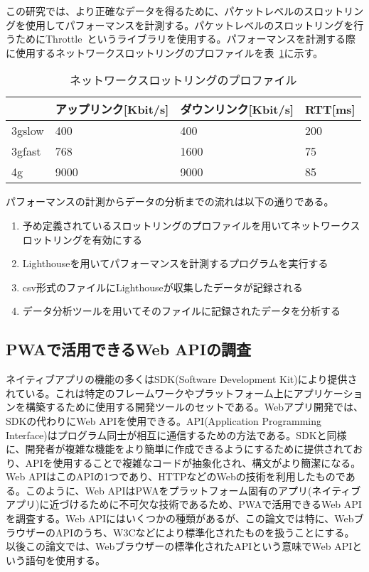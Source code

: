 この研究では、より正確なデータを得るために、パケットレベルのスロットリングを使用してパフォーマンスを計測する。パケットレベルのスロットリングを行うためにThrottle~\cite{Throttle}というライブラリを使用する。パフォーマンスを計測する際に使用するネットワークスロットリングのプロファイルを表~\ref{table:ネットワークスロットリングのプロファイル}に示す。
\begin{table}
  \caption{ネットワークスロットリングのプロファイル}
  \label{table:ネットワークスロットリングのプロファイル}
  \centering
  \begin{tabular}{|p{5em}|p{10em}|p{10em}|p{10em}|}
    \hline
    & アップリンク[Kbit/s] & ダウンリンク[Kbit/s] & RTT[ms] \\ \hline
    3gslow & 400 & 400 & 200 \\ \hline
    3gfast & 768 & 1600 & 75 \\ \hline
    4g & 9000 & 9000 & 85 \\ \hline
  \end{tabular}
\end{table}
パフォーマンスの計測からデータの分析までの流れは以下の通りである。
\begin{enumerate}
    \item 予め定義されているスロットリングのプロファイルを用いてネットワークスロットリングを有効にする
    \item Lighthouseを用いてパフォーマンスを計測するプログラムを実行する
    \item csv形式のファイルにLighthouseが収集したデータが記録される
    \item データ分析ツールを用いてそのファイルに記録されたデータを分析する
\end{enumerate}

\subsection{PWAで活用できるWeb APIの調査}\label{subsection:PWAで活用できるWeb APIの調査}
ネイティブアプリの機能の多くはSDK(Software Development Kit)により提供されている。これは特定のフレームワークやプラットフォーム上にアプリケーションを構築するために使用する開発ツールのセットである。Webアプリ開発では、SDKの代わりにWeb APIを使用できる。API(Application Programming Interface)はプログラム同士が相互に通信するための方法である。SDKと同様に、開発者が複雑な機能をより簡単に作成できるようにするために提供されており、APIを使用することで複雑なコードが抽象化され、構文がより簡潔になる。Web APIはこのAPIの1つであり、HTTPなどのWebの技術を利用したものである。このように、Web APIはPWAをプラットフォーム固有のアプリ(ネイティブアプリ)に近づけるために不可欠な技術であるため、PWAで活用できるWeb APIを調査する。Web APIにはいくつかの種類があるが、この論文では特に、WebブラウザーのAPIのうち、W3Cなどにより標準化されたものを扱うことにする。以後この論文では、Webブラウザーの標準化されたAPIという意味でWeb APIという語句を使用する。
